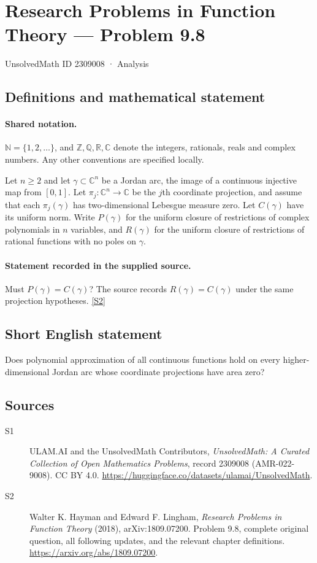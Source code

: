 \documentclass[11pt]{book}
\newcommand{\sref}[2]{\hyperlink{source:#1:#2}{[S#2]}}
\begin{document}
\setcounter{section}{2309007}
\section{Research Problems in Function Theory — Problem 9.8}\label{2309008}
{\small\sffamily UnsolvedMath ID 2309008 · Analysis}
\subsection{Definitions and mathematical statement}

\paragraph{Shared notation.}$\mathbb N=\{1,2,\ldots\}$, and $\mathbb Z,\mathbb Q,\mathbb R,\mathbb C$ denote the integers, rationals, reals and complex numbers. Any other conventions are specified locally.


Let $n\ge2$ and let $\gamma\subset\mathbb C^n$ be a Jordan arc, the image of a continuous injective map from $[0,1]$. Let $\pi_j:\mathbb C^n\to\mathbb C$ be the $j$th coordinate projection, and assume that each $\pi_j(\gamma)$ has two-dimensional Lebesgue measure zero. Let $C(\gamma)$ have its uniform norm. Write $P(\gamma)$ for the uniform closure of restrictions of complex polynomials in $n$ variables, and $R(\gamma)$ for the uniform closure of restrictions of rational functions with no poles on $\gamma$.
\paragraph{Statement recorded in the supplied source.}
Must $P(\gamma)=C(\gamma)$? The source records $R(\gamma)=C(\gamma)$ under the same projection hypotheses. \sref{2309008}{2}
\subsection{Short English statement}
Does polynomial approximation of all continuous functions hold on every higher-dimensional Jordan arc whose coordinate projections have area zero?
\subsection{Sources}
\begin{description}
\item[\hypertarget{source:2309008:1}{S1}] ULAM.AI and the UnsolvedMath Contributors, \emph{UnsolvedMath: A Curated Collection of Open Mathematics Problems}, record 2309008 (AMR-022-9008). CC BY 4.0. \url{https://huggingface.co/datasets/ulamai/UnsolvedMath}.
\item[\hypertarget{source:2309008:2}{S2}] Walter K. Hayman and Edward F. Lingham, \emph{Research Problems in Function Theory} (2018), arXiv:1809.07200. Problem 9.8, complete original question, all following updates, and the relevant chapter definitions. \url{https://arxiv.org/abs/1809.07200}.
\end{description}
\label{end:2309008}
\end{document}
